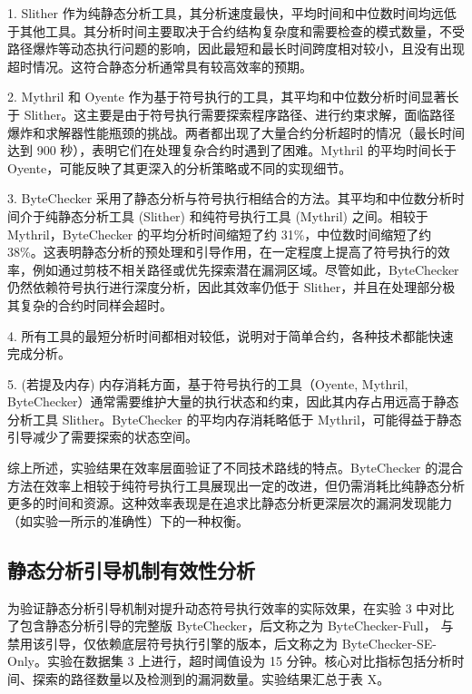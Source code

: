 \documentclass[print, master, vlined, timesmath]{DissertUESTC}
\begin{document}
1.  Slither 作为纯静态分析工具，其分析速度最快，平均时间和中位数时间均远低于其他工具。其分析时间主要取决于合约结构复杂度和需要检查的模式数量，不受路径爆炸等动态执行问题的影响，因此最短和最长时间跨度相对较小，且没有出现超时情况。这符合静态分析通常具有较高效率的预期。

2.  Mythril 和 Oyente 作为基于符号执行的工具，其平均和中位数分析时间显著长于 Slither。这主要是由于符号执行需要探索程序路径、进行约束求解，面临路径爆炸和求解器性能瓶颈的挑战。两者都出现了大量合约分析超时的情况（最长时间达到 900 秒），表明它们在处理复杂合约时遇到了困难。Mythril 的平均时间长于 Oyente，可能反映了其更深入的分析策略或不同的实现细节。

3.  ByteChecker 采用了静态分析与符号执行相结合的方法。其平均和中位数分析时间介于纯静态分析工具 (Slither) 和纯符号执行工具 (Mythril) 之间。相较于 Mythril，ByteChecker 的平均分析时间缩短了约 31\%，中位数时间缩短了约 38\%。这表明静态分析的预处理和引导作用，在一定程度上提高了符号执行的效率，例如通过剪枝不相关路径或优先探索潜在漏洞区域。尽管如此，ByteChecker 仍然依赖符号执行进行深度分析，因此其效率仍低于 Slither，并且在处理部分极其复杂的合约时同样会超时。

4.  所有工具的最短分析时间都相对较低，说明对于简单合约，各种技术都能快速完成分析。

5.  (若提及内存) 内存消耗方面，基于符号执行的工具（Oyente, Mythril, ByteChecker）通常需要维护大量的执行状态和约束，因此其内存占用远高于静态分析工具 Slither。ByteChecker 的平均内存消耗略低于 Mythril，可能得益于静态引导减少了需要探索的状态空间。

综上所述，实验结果在效率层面验证了不同技术路线的特点。ByteChecker 的混合方法在效率上相较于纯符号执行工具展现出一定的改进，但仍需消耗比纯静态分析更多的时间和资源。这种效率表现是在追求比静态分析更深层次的漏洞发现能力（如实验一所示的准确性）下的一种权衡。


    
\subsection{静态分析引导机制有效性分析}
    
为验证静态分析引导机制对提升动态符号执行效率的实际效果，在实验 3 中对比了包含静态分析引导的完整版 ByteChecker，后文称之为 ByteChecker-Full， 与禁用该引导，仅依赖底层符号执行引擎的版本，后文称之为  ByteChecker-SE-Only。实验在数据集 3 上进行，超时阈值设为 15 分钟。核心对比指标包括分析时间、探索的路径数量以及检测到的漏洞数量。实验结果汇总于表 X。
\end{document}
